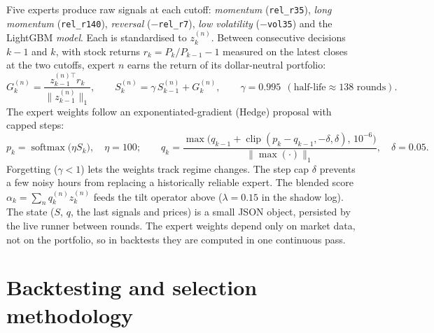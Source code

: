 \documentclass[11pt,a4paper]{article}
\newcommand{\code}[1]{\texttt{#1}}
\DeclareMathOperator{\clip}{clip}
\begin{document}
Five experts produce raw signals at each cutoff: \emph{momentum} (\code{rel\_r35}), \emph{long momentum}
(\code{rel\_r140}), \emph{reversal} ($-$\code{rel\_r7}), \emph{low volatility} ($-$\code{vol35}) and the LightGBM
\emph{model}. Each is standardised to $z^{(n)}_k$. Between consecutive decisions $k-1$ and $k$, with stock returns
$r_k=P_k/P_{k-1}-1$ measured on the latest closes at the two cutoffs, expert $n$ earns the return of its dollar-neutral
portfolio:
\begin{equation}
  G^{(n)}_k=\frac{z^{(n)\top}_{k-1}r_k}{\|z^{(n)}_{k-1}\|_1},\qquad
  S^{(n)}_k=\gamma\,S^{(n)}_{k-1}+G^{(n)}_k,\qquad \gamma=0.995\ \ (\text{half-life}\approx138\text{ rounds}).
\end{equation}
The expert weights follow an exponentiated-gradient (Hedge) proposal with capped steps:
\begin{equation}
  p_k=\operatorname{softmax}\!\big(\eta S_k\big),\quad \eta=100;\qquad
  q_k=\frac{\max\!\big(q_{k-1}+\clip(p_k-q_{k-1},-\delta,\delta),\,10^{-6}\big)}{\big\|\max(\cdot)\big\|_1},\quad \delta=0.05 .
\end{equation}
Forgetting ($\gamma<1$) lets the weights track regime changes. The step cap $\delta$ prevents a few noisy hours from
replacing a historically reliable expert. The blended score $\alpha_k=\sum_nq^{(n)}_kz^{(n)}_k$ feeds the tilt operator
above ($\lambda=0.15$ in the shadow log). The state ($S$, $q$, the last signals and prices) is a small JSON object,
persisted by the live runner between rounds. The expert weights depend only on market data, not on the portfolio,
so in backtests they are computed in one continuous pass.

\section{Backtesting and selection methodology}\label{sec:backtest}
\end{document}
